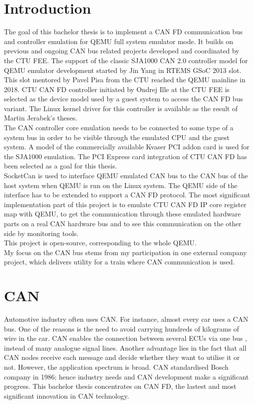 \documentclass{ctuthesis}
\begin{document}
\chapter{Introduction}
 The goal of this bachelor thesis is to implement a CAN FD communication bus and controller emulation for QEMU full system emulator mode. It builds on previous and ongoing CAN bus related projects developed and coordinated by the CTU FEE. The support of the classic SJA1000 CAN 2.0 controller model for QEMU emulator development started by Jin Yang in RTEMS GSoC 2013 slot. This slot mentored by Pavel Pisa from the CTU reached the QEMU mainline in 2018. \cite{qemu-mainline} CTU CAN FD controller \cite{ctu-canfd-core} initiated by Ondrej Ille at the CTU FEE is selected as the device model used by a guest system to access the CAN FD bus variant. The Linux kernel driver for this controller is available as the result of Martin Jerabek's theses. \cite{ctu-canfd} \\
 The CAN controller core emulation needs to be connected to some type of a system bus in order to be visible through the emulated CPU and the guest system. A model of the commercially available Kvaser PCI addon card is used for the SJA1000 emulation. The PCI Express card integration of CTU CAN FD \cite{ctu-project} has been selected as a goal for this thesis. \\
 SocketCan is used to interface QEMU emulated CAN bus to the CAN bus of the host system when QEMU is run on the Linux system. The QEMU side of the interface has to be extended to support a CAN FD protocol.
The most significant implementation part of this project is to emulate CTU CAN FD IP core register map \cite{progdum} with QEMU, to get the communication through these emulated hardware parts on a real CAN hardware bus and to see this communication on the other side by monitoring tools. \\
This project is open-source, corresponding to the whole QEMU. \\
My focus on the CAN bus stems from my participation in one external company project, which delivers utility for a train where CAN communication is used.

\chapter{CAN}
 Automotive industry often uses CAN.  For instance, almost every car uses a CAN bus. One of the reasons is the need to avoid carrying hundreds of kilograms of wire in the car. CAN enables the connection between several ECUs via one bus \cite{ECUs}, instead of many analogue signal lines. Another advantage lies in the fact that all CAN nodes receive each message and decide whether they want to utilise it or not. However, the application spectrum is broad. CAN standardised Bosch company in 1986; hence industry needs and CAN development make a significant progress. This bachelor thesis concentrates on CAN FD, the lastest and most significant innovation in CAN technology.
\end{document}
